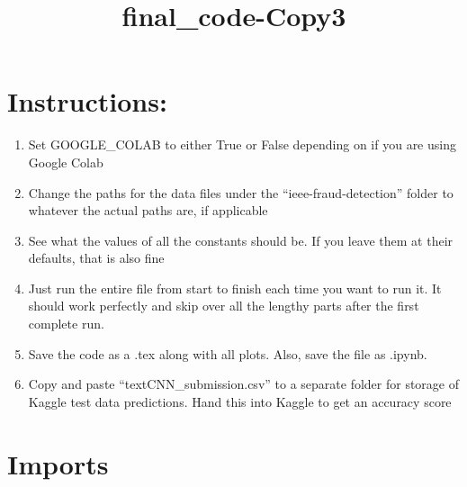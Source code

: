 \documentclass[11pt]{article}
\title{final\_code-Copy3}
\providecommand{\tightlist}{%
      \setlength{\itemsep}{0pt}\setlength{\parskip}{0pt}}
\begin{document}
    
    \maketitle
    
    

    
    \hypertarget{instructions}{%
\section{Instructions:}\label{instructions}}

\begin{enumerate}
\def\labelenumi{\arabic{enumi}.}
\tightlist
\item
  Set GOOGLE\_COLAB to either True or False depending on if you are
  using Google Colab
\item
  Change the paths for the data files under the ``ieee-fraud-detection''
  folder to whatever the actual paths are, if applicable
\item
  See what the values of all the constants should be. If you leave them
  at their defaults, that is also fine
\item
  Just run the entire file from start to finish each time you want to
  run it. It should work perfectly and skip over all the lengthy parts
  after the first complete run.
\item
  Save the code as a .tex along with all plots. Also, save the file as
  .ipynb.
\item
  Copy and paste ``textCNN\_submission.csv'' to a separate folder for
  storage of Kaggle test data predictions. Hand this into Kaggle to get
  an accuracy score
\end{enumerate}

    \hypertarget{imports}{%
\section{Imports}\label{imports}}
\end{document}
